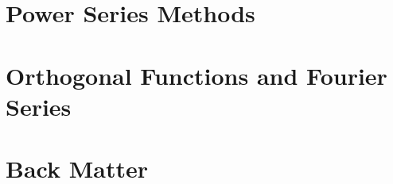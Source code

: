 \documentclass{tufte-book}
\theoremstyle{break}
\begin{document}
\part{Power Series Methods}













\part{Orthogonal Functions and Fourier Series}





\part{Back Matter}
\backmatter





\appendix
\appendixpage
\noappendicestocpagenum
\addappheadtotoc
\end{document}
